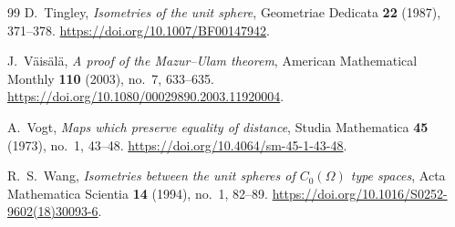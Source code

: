 \begin{thebibliography}{99}
D.~Tingley,
\emph{Isometries of the unit sphere},
Geometriae Dedicata \textbf{22} (1987), 371--378.
\url{https://doi.org/10.1007/BF00147942}.

J.~V\"ais\"al\"a,
\emph{A proof of the Mazur--Ulam theorem},
American Mathematical Monthly \textbf{110} (2003), no.~7, 633--635.
\url{https://doi.org/10.1080/00029890.2003.11920004}.

A.~Vogt,
\emph{Maps which preserve equality of distance},
Studia Mathematica \textbf{45} (1973), no.~1, 43--48.
\url{https://doi.org/10.4064/sm-45-1-43-48}.

R.~S.~Wang,
\emph{Isometries between the unit spheres of $C_0(\Omega)$ type spaces},
Acta Mathematica Scientia \textbf{14} (1994), no.~1, 82--89.
\url{https://doi.org/10.1016/S0252-9602(18)30093-6}.

\end{thebibliography}
